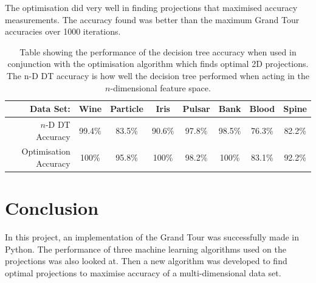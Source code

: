 \documentclass[a4paper,11pt,twoside]{article}
\begin{document}
The optimisation did very well in finding projections that maximised accuracy measurements. The accuracy found was better than the maximum Grand Tour accuracies over 1000 iterations.

\begin{table}[h]
\caption{Table showing the performance of the decision tree accuracy when used in conjunction with the optimisation algorithm which finds optimal 2D projections. The n-D DT accuracy is how well the decision tree performed when acting in the $n$-dimensional feature space.}
\begin{tabular}{|r|c|c|c|c|c|c|c|}
\hline
Data Set:             & Wine   & Particle & Iris   & Pulsar & Bank   & Blood  & Spine  \\ \hline
$n$-D DT Accuracy       & 99.4\% & 83.5\%   & 90.6\% & 97.8\% & 98.5\% & 76.3\% & 82.2\% \\ \hline
Optimisation Accuracy & 100\%  & 95.8\%   & 100\%  & 98.2\% & 100\%  & 83.1\% & 92.2\% \\ \hline
\end{tabular}
\end{table}

\newpage
\section{Conclusion}

In this project, an implementation of the Grand Tour was successfully made in Python. The performance of three machine learning algorithms used on the projections was also looked at. Then a new algorithm was developed to find optimal projections to maximise accuracy of a multi-dimensional data set.
\newline
\end{document}
